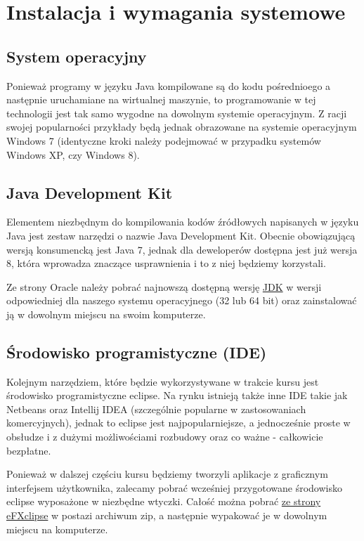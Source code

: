 \documentclass[letterpaper,10pt,english]{sphinxmanual}
\begin{document}
\section{Instalacja i wymagania systemowe}
\label{config:instalacja-i-wymagania-systemowe}\label{config::doc}

\subsection{System operacyjny}
\label{config:system-operacyjny}
Ponieważ programy w języku Java kompilowane są do kodu pośrednioego a następnie uruchamiane na wirtualnej maszynie, to programowanie w tej technologii jest tak samo wygodne na dowolnym systemie operacyjnym. Z racji swojej popularności przykłady będą jednak obrazowane na systemie operacyjnym Windows 7 (identyczne kroki należy podejmować w przypadku systemów Windows XP, czy Windows 8).


\subsection{Java Development Kit}
\label{config:java-development-kit}
Elementem niezbędnym do kompilowania kodów źródłowych napisanych w języku Java jest zestaw narzędzi o nazwie Java Development Kit. Obecnie obowiązującą wersją konsumencką jest Java 7, jednak dla deweloperów dostępna jest już wersja 8, która wprowadza znaczące usprawnienia i to z niej będziemy korzystali.

Ze strony Oracle należy pobrać najnowszą dostępną wersję \href{http://www.oracle.com/technetwork/java/javase/downloads/jdk8-downloads-2133151.html}{JDK} w wersji odpowiedniej dla naszego systemu operacyjnego (32 lub 64 bit) oraz zainstalować ją w dowolnym miejscu na swoim komputerze.


\subsection{Środowisko programistyczne (IDE)}
\label{config:srodowisko-programistyczne-ide}
Kolejnym narzędziem, które będzie wykorzystywane w trakcie kursu jest środowisko programistyczne eclipse. Na rynku istnieją także inne IDE takie jak Netbeans oraz Intellij IDEA (szczególnie popularne w zastosowaniach komercyjnych), jednak to eclipse jest najpopularniejsze, a jednocześnie proste w obsłudze i z dużymi możliwościami rozbudowy oraz co ważne - całkowicie bezpłatne.

Ponieważ w dalszej częściu kursu będziemy tworzyli aplikacje z graficznym interfejsem użytkownika, zalecamy pobrać wcześniej przygotowane środowisko eclipse wyposażone w niezbędne wtyczki. Całość można pobrać \href{http://efxclipse.bestsolution.at/install.html}{ze strony eFXclipse} w postazi archiwum zip, a następnie wypakować je w dowolnym miejscu na komputerze.
\end{document}

